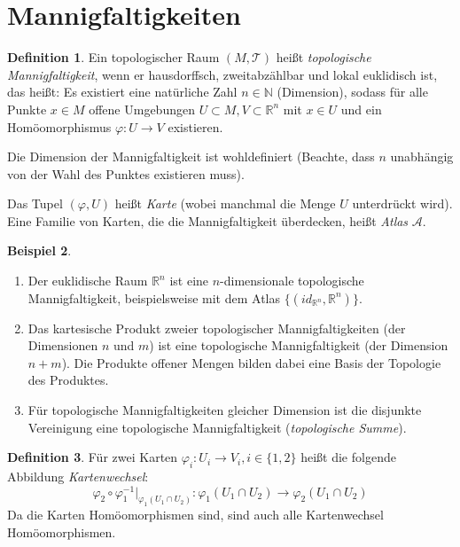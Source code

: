 \documentclass[a4paper]{scrreprt}
\numberwithin{equation}{chapter}
\newcommand{\R}{\mathbb{R}}
\theoremstyle{definition}
\newtheorem{defn}{Definition}[section]
\newtheorem{bsp}[defn]{Beispiel}
\begin{document}
	\section{Mannigfaltigkeiten}
		\begin{defn}
			Ein topologischer Raum $(M,\mathcal{T})$ heißt \emph{topologische Mannigfaltigkeit}, wenn er hausdorffsch, zweitabzählbar und lokal euklidisch ist, das heißt:
			Es existiert eine natürliche Zahl $n\in \mathbb{N}$ (Dimension), sodass für alle Punkte $x\in M$ offene Umgebungen $U\subset M, V\subset \R^n$ mit $x\in U $ und ein Homöomorphismus $ \varphi\colon U\rightarrow V$ existieren.

			Die Dimension der Mannigfaltigkeit ist wohldefiniert (Beachte, dass $n$ unabhängig von der Wahl des Punktes existieren muss).

			Das Tupel $(\varphi,U)$ heißt \emph{Karte} (wobei manchmal die Menge $U$ unterdrückt wird). Eine Familie von Karten, die die Mannigfaltigkeit überdecken, heißt \emph{Atlas} $\mathcal{A}$.
		\end{defn}
		\begin{bsp}\hfill 
			\begin{enumerate}
				\item Der euklidische Raum $\R^n$ ist eine $n$-dimensionale topologische Mannigfaltigkeit, beispielsweise mit dem Atlas $\lbrace (id_{\R^n},\R^n)\rbrace$. 
				\item Das kartesische Produkt zweier topologischer Mannigfaltigkeiten (der Dimensionen $n$ und $m$) ist eine topologische Mannigfaltigkeit (der Dimension $n + m$). Die Produkte offener Mengen bilden dabei eine Basis der Topologie des Produktes.
				\item Für topologische Mannigfaltigkeiten gleicher Dimension ist die disjunkte Vereinigung eine topologische Mannigfaltigkeit (\emph{topologische Summe}).
			\end{enumerate}
		\end{bsp}
		\begin{defn}
			Für zwei Karten $\varphi_i\colon U_i\rightarrow V_i, i\in\lbrace 1,2 \rbrace$ heißt die folgende Abbildung \emph{Kartenwechsel}:
			\begin{equation*}
				\varphi_2\circ\varphi_1^{-1}\vert_{\varphi_1(U_1\cap U_2)}\colon \varphi_1(U_1\cap U_2)\rightarrow \varphi_2(U_1\cap U_2)
			\end{equation*}
			Da die Karten Homöomorphismen sind, sind auch alle Kartenwechsel Homöomorphismen.
		\end{defn} 
\end{document}
